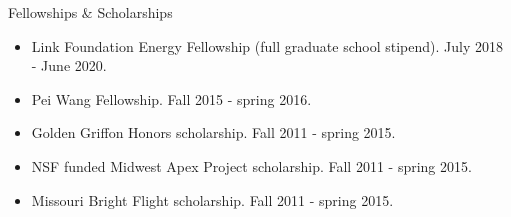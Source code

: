 \documentclass{resume} %
\begin{document}
\iffalse
\begin{rSection}{Teaching Experience}
	
	\begin{rSubsectionlistless}{Physical Chemistry: Thermodynamics}{Fall 2016}{Teaching Assistant for Prof. Gilbert M. Nathanson }{Madison, WI}
	\end{rSubsectionlistless}
	
	\begin{rSubsectionlistless}{General Chemistry}{Fall 2015 - spring 2016}{Teaching Assistant for Prof. Ive Herman and Dr. Paul Hooker}{Madison, WI}
	\end{rSubsectionlistless}
	
	\begin{rSubsectionlistless}{Organic Chemistry II}{Fall 2013}{Teaching Assistant for Prof. Steven P. Lorimor}{Saint Joseph, MO}
	\end{rSubsectionlistless}
	
\end{rSection}
\fi



\begin{rSection}{Fellowships \& Scholarships}
	
\begin{itemize}[leftmargin = 0 pt]
	\item Link Foundation Energy Fellowship (full graduate school stipend). July 2018 - June 2020. 
	\item Pei Wang Fellowship. Fall 2015 - spring 2016.
	\item Golden Griffon Honors scholarship. Fall 2011 - spring 2015.
	\item NSF funded Midwest Apex Project scholarship. Fall 2011 - spring 2015.
	\item Missouri Bright Flight scholarship. Fall 2011 - spring 2015.
\end{itemize}
	
\end{rSection}
\end{document}
